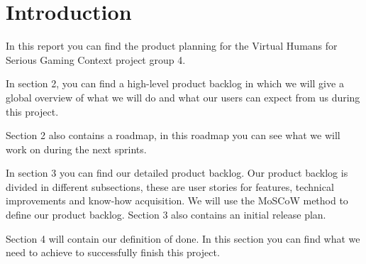 \section{Introduction}
In this report you can find the product planning for the Virtual Humans for Serious Gaming Context project group 4. \\ \par 
In section 2, you can find a high-level product backlog in which we will give a global overview of what we will do and what our users can expect from us during this project. \par
Section 2 also contains a roadmap, in this roadmap you can see what we will work on during the next sprints. \\ \par
In section 3 you can find our detailed product backlog. Our product backlog is divided in different subsections, these are user stories for features, technical improvements and know-how acquisition. We will use the MoSCoW method to define our product backlog. Section 3 also contains an initial release plan. \\ \par
Section 4 will contain our definition of done. In this section you can find what we need to achieve to successfully finish this project. \\ \par
